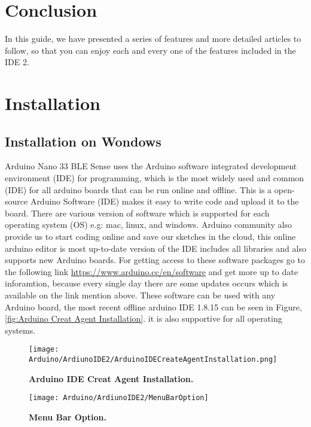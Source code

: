 \section{Conclusion}
In this guide, we have presented a series of features and more detailed articles to follow, so that you can enjoy each and every one of the features included in the IDE 2.


\section{Installation}

\subsection{Installation on Wondows}\label{Arduinoide}



Arduino Nano 33 BLE Sense uses the Arduino software integrated development environment (IDE) for programming, which is the most widely used and common (IDE) for all arduino boards that can be run online and offline. This is a open-source Arduino Software (IDE) makes it easy to write code and upload it to the board. There are various version of software which is supported for each operating system (OS) e.g: mac, linux, and windows. Arduino community also provide us to start coding online and save our sketches in the cloud, this online arduino editor is most up-to-date version of the IDE includes all libraries and also supports new Arduino boards. For getting access to these software packages go to the following link \url{https://www.arduino.cc/en/software}  and get more up to date inforamtion, because every single day there are some updates occurs which is available on the link mention above. These software can be used with any Arduino board, the most recent offline arduino IDE 1.8.15 can be seen in Figure,\ref{fig:Arduino Creat Agent Installation}. it is also supportive for all operating systems.

\begin{figure}[H]\centering
    \texttt{[image: Arduino/ArdiunoIDE2/ArduinoIDECreateAgentInstallation.png]}
    \caption{\textbf{Arduino IDE Creat Agent Installation.}}
    \label{fig:Arduino IDE Creat Agent Installation}		
\end{figure}

\begin{figure}[H]\centering
    \texttt{[image: Arduino/ArdiunoIDE2/MenuBarOption]}
    \caption{\textbf{Menu Bar Option.}}
    \label{fig::Menu Bar Option}		
\end{figure}

